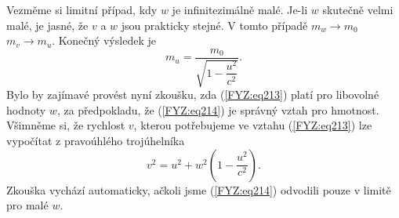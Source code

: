 {{    Vezměme si limitní případ, kdy \(w\) je infinitezimálně malé. Je-li \(w\) skutečně velmi malé, 
    je jasné, že \(v\) a \(w\) jsou prakticky stejné. V tomto případě \(m_w \rightarrow m_0\)  
    \(m_v \rightarrow m_u\). Konečný výsledek je
    \begin{equation}\label{FYZ:eq214}
      m_u = \frac{m_0}{\sqrt{1 - \dfrac{u^2}{c^2}}}.
    \end{equation}
    Bylo by zajímavé provést nyní zkoušku, zda (\ref{FYZ:eq213}) platí pro libovolné hodnoty \(w\), 
    za předpokladu, že (\ref{FYZ:eq214}) je správný vztah pro hmotnost. Všimněme si, že rychlost 
    \(v\), kterou potřebujeme ve vztahu (\ref{FYZ:eq213}) lze vypočítat z pravoúhlého trojúhelníka
    \begin{equation}\label{FYZ:eq215}
      v^2 = u^2 + w^2\left(1 - \dfrac{u^2}{c^2}\right).
    \end{equation}
    Zkouška vychází automaticky, ačkoli jsme (\ref{FYZ:eq214}) odvodili pouze v limitě pro malé 
    \(w\).
    
}}

